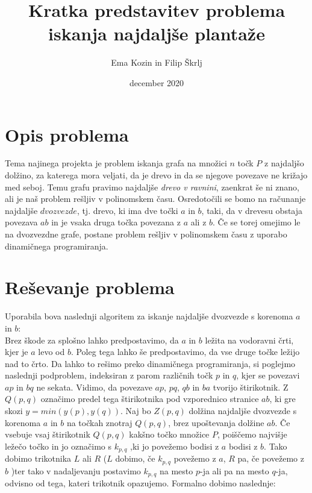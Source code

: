\documentclass[a4paper,12pt]{article}
\title{Kratka predstavitev problema iskanja najdaljše plantaže}
\author{Ema Kozin in Filip Škrlj}
\date{december 2020}
\begin{document}
\maketitle

\newpage
\section{Opis problema}

Tema najinega projekta je problem iskanja grafa na množici $n$ točk $P$ z najdaljšo dolžino, za katerega mora veljati, da je drevo in da se njegove povezave ne križajo med seboj. Temu grafu pravimo najdaljše \emph{drevo v ravnini}, zaenkrat še ni znano, ali je naš problem rešljiv v polinomskem času.
Osredotočili se bomo na računanje najdaljše $dvozvezde$, tj. drevo, ki ima dve točki $a$ in $b$, taki, da v drevesu obstaja povezava $ab$ in je vsaka druga točka povezana z $a$ ali z $b$. Če se torej omejimo le na dvozvezdne grafe, postane problem rešljiv v polinomskem času z uporabo dinamičnega programiranja.



\section{Reševanje problema}
Uporabila bova naslednji algoritem za iskanje najdaljše dvozvezde s korenoma $a$ in $b$: \\
Brez škode za splošno lahko predpostavimo, da $a$ in $b$ ležita na vodoravni črti, kjer je $a$ levo od $b$. Poleg tega lahko še predpostavimo, da vse druge točke ležijo nad to črto. Da lahko to rešimo preko dinamičnega programiranja, si poglejmo naslednji podproblem, indeksiran z parom različnih točk $p$ in $q$, kjer se povezavi $ap$ in $bq$ ne sekata. Vidimo, da povezave $ap$, $pq$, $qb$ in $ba$ tvorijo štirikotnik. Z $Q(p,q)$ označimo predel tega štirikotnika pod vzporednico stranice $ab$, ki gre skozi $y = min(y(p),y(q))$.
Naj bo $Z(p,q)$ dolžina najdaljše dvozvezde s korenoma $a$ in $b$ na točkah znotraj $Q(p,q)$, brez upoštevanja dolžine $ab$. Če vsebuje vsaj štirikotnik $Q(p,q)$ kakšno točko množice $P$, poiščemo najvišje ležečo točko in jo označimo s $k_{p,q}$ ,ki jo povežemo bodisi z $a$ bodisi z $b$. Tako dobimo  trikotnika $L$ ali $R$ ($L$ dobimo, če $k_{p,q}$ povežemo z $a$, $R$ pa, če povežemo z $b$ )ter tako v nadaljevanju postavimo $k_{p,q}$ na mesto $p$-ja ali pa na mesto $q$-ja, odvisno od tega, kateri trikotnik opazujemo. Formalno dobimo naslednje: \\
\end{document}
